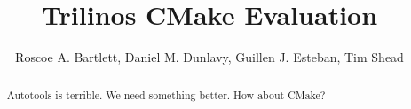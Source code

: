 \documentclass[pdf,ps2pdf,11pt]{SANDreport}
\title{
Trilinos CMake Evaluation
}
\author{Roscoe A. Bartlett, Daniel M. Dunlavy, Guillen J. Esteban, Tim Shead}
\date{}
\begin{document}
\raggedright

\maketitle

%

%
\begin{abstract}
%
Autotools is terrible. We need something better.  How about CMake?
%
\end{abstract}
%

%
%
%

%
\tableofcontents


\end{document}
